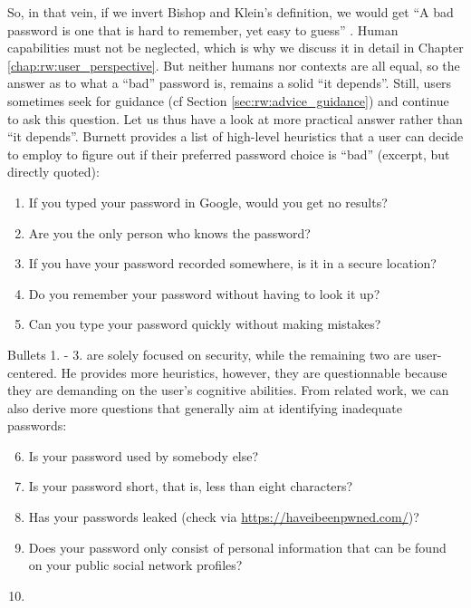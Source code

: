 So, in that vein, if we invert Bishop and Klein's definition, we would get ``A bad password is one that is hard to remember, yet easy to guess'' \cite{Bishop1995ProactivePasswordChecking}. Human capabilities must not be neglected, which is why we discuss it in detail in Chapter \ref{chap:rw:user_perspective}. But neither humans nor contexts are all equal, so the answer as to what a ``bad'' password is, remains a solid ``it depends''. Still, users sometimes seek for guidance (cf Section \ref{sec:rw:advice_guidance}) and continue to ask this question. Let us thus have a look at more practical answer rather than ``it depends''. Burnett provides a list of high-level heuristics that a user can decide to employ to figure out if their preferred password choice is ``bad'' \cite{Burnett2005PerfectPasswords} (excerpt, but directly quoted):
\begin{enumerate}
	\item If you typed your password in Google, would you get no results?
	\item Are you the only person who knows the password?
	\item If you have your password recorded somewhere, is it in a secure location?
	\item Do you remember your password without having to look it up?
	\item Can you type your password quickly without making mistakes?
\end{enumerate}
Bullets 1. - 3. are solely focused on security, while the remaining two are user-centered. He provides more heuristics, however, they are questionnable because they are demanding on the user's cognitive abilities. From related work, we can also derive more questions that generally aim at identifying inadequate passwords:
\begin{enumerate}\setcounter{enumi}{5}
	\item Is your password used by somebody else? \cite{Bonneau2012ScienceOfGuessing}
	\item Is your password short, that is, less than eight characters? \cite{Weir2010MetricsPolicies}
	\item Has your passwords leaked (check via \url{https://haveibeenpwned.com/})? \cite{Wheeler2016zxcvbn}
	\item Does your password only consist of personal information that can be found on your public social network profiles? \cite{Li2017PersonalInformation}
	\item {}
\end{enumerate}

